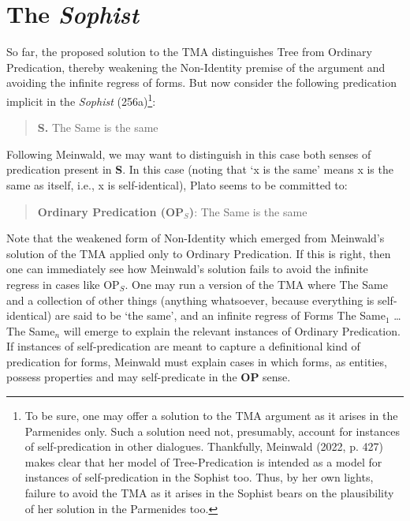\documentclass [article] {memoir}
\begin{document}
\chapter{The \textit{Sophist}}
So far, the proposed solution to the TMA distinguishes Tree from Ordinary Predication, thereby weakening the Non-Identity premise of the argument and avoiding the infinite regress of forms. But now consider the following predication implicit in the \textit{Sophist} (256a)\footnote{To be sure, one may offer a solution to the TMA argument as it arises in the Parmenides only. Such a solution need not, presumably, account for instances of self-predication in other dialogues. Thankfully, Meinwald (2022, p. 427) makes clear that her model of Tree-Predication is intended as a model for instances of self-predication in the Sophist too. Thus, by her own lights, failure to avoid the TMA as it arises in the Sophist bears on the plausibility of her solution in the Parmenides too.}:
\begin{quote}
\textbf{S.} The Same is the same
\end{quote}
Following Meinwald, we may want to distinguish in this case both senses of predication present in \textbf{S}. In this case (noting that `x is the same' means x is the same as itself, i.e., x is self-identical), Plato seems to be committed to: 
\begin{quote}
\textbf{Ordinary Predication (OP$_S$)}: The Same is the same
\end{quote}
Note that the weakened form of Non-Identity which emerged from Meinwald's solution of the TMA applied only to Ordinary Predication. If this is right, then one can immediately see how Meinwald's solution fails to avoid the infinite regress in cases like OP$_S$. One may run a version of the TMA where The Same and a collection of other things (anything whatsoever, because everything is self-identical) are said to be `the same', and an infinite regress of Forms The Same$_1$ \dots The Same$_n$ will emerge to explain the relevant instances of Ordinary Predication. If instances of self-predication are meant to capture a definitional kind of predication for forms, Meinwald must explain cases in which forms, as entities, possess properties and may self-predicate in the \textbf{OP} sense.
\end{document}
